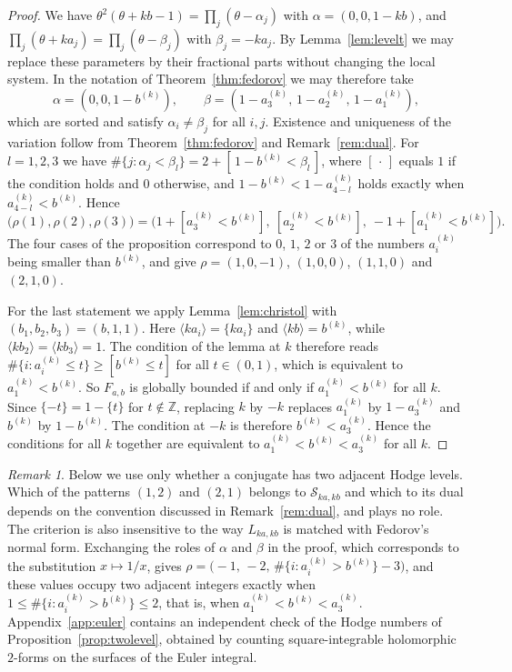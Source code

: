 \documentclass[11pt]{amsart}
\theoremstyle{definition}
\theoremstyle{remark}
\newtheorem{remark}[theorem]{Remark}
\numberwithin{equation}{section}
\newcommand{\Z}{\mathbb{Z}}
\newcommand{\cS}{\mathcal{S}}
\newcommand{\ak}[1]{a^{(k)}_{#1}}
\newcommand{\bk}{b^{(k)}}
\newcommand{\Fab}{F_{a,b}}
\begin{document}
\begin{proof}
We have $\theta^2(\theta+kb-1)=\prod_j(\theta-\alpha_j)$ with $\alpha=(0,0,1-kb)$, and $\prod_j(\theta+ka_j)=\prod_j(\theta-\beta_j)$ with $\beta_j=-ka_j$. By Lemma~\ref{lem:levelt} we may replace these parameters by their fractional parts without changing the local system. In the notation of Theorem~\ref{thm:fedorov} we may therefore take
\[
\alpha=(0,0,1-\bk),\qquad\beta=(1-\ak3,\,1-\ak2,\,1-\ak1),
\]
which are sorted and satisfy $\alpha_i\ne\beta_j$ for all $i,j$. Existence and uniqueness of the variation follow from Theorem~\ref{thm:fedorov} and Remark~\ref{rem:dual}. For $l=1,2,3$ we have $\#\{j:\alpha_j<\beta_l\}=2+[\,1-\bk<\beta_l\,]$, where $[\,\cdot\,]$ equals $1$ if the condition holds and $0$ otherwise, and $1-\bk<1-\ak{4-l}$ holds exactly when $\ak{4-l}<\bk$. Hence
\[
\big(\rho(1),\rho(2),\rho(3)\big)=\big(1+[\ak3<\bk],\ [\ak2<\bk],\ -1+[\ak1<\bk]\big).
\]
The four cases of the proposition correspond to $0$, $1$, $2$ or $3$ of the numbers $\ak i$ being smaller than $\bk$, and give $\rho=(1,0,-1)$, $(1,0,0)$, $(1,1,0)$ and $(2,1,0)$.

For the last statement we apply Lemma~\ref{lem:christol} with $(b_1,b_2,b_3)=(b,1,1)$. Here $\langle ka_i\rangle=\{ka_i\}$ and $\langle kb\rangle=\bk$, while $\langle kb_2\rangle=\langle kb_3\rangle=1$. The condition of the lemma at $k$ therefore reads $\#\{i:\ak i\le t\}\ge[\bk\le t]$ for all $t\in(0,1)$, which is equivalent to $\ak1<\bk$. So $\Fab$ is globally bounded if and only if $\ak1<\bk$ for all $k$. Since $\{-t\}=1-\{t\}$ for $t\notin\Z$, replacing $k$ by $-k$ replaces $\ak1$ by $1-\ak3$ and $\bk$ by $1-\bk$. The condition at $-k$ is therefore $\bk<\ak3$. Hence the conditions for all $k$ together are equivalent to $\ak1<\bk<\ak3$ for all $k$.
\end{proof}

\begin{remark}
Below we use only whether a conjugate has two adjacent Hodge levels. Which of the patterns $(1,2)$ and $(2,1)$ belongs to $\cS_{ka,kb}$ and which to its dual depends on the convention discussed in Remark~\ref{rem:dual}, and plays no role. The criterion is also insensitive to the way $L_{ka,kb}$ is matched with Fedorov's normal form. Exchanging the roles of $\alpha$ and $\beta$ in the proof, which corresponds to the substitution $x\mapsto1/x$, gives $\rho=\big(-1,\,-2,\,\#\{i:\ak i>\bk\}-3\big)$, and these values occupy two adjacent integers exactly when $1\le\#\{i:\ak i>\bk\}\le2$, that is, when $\ak1<\bk<\ak3$. Appendix~\ref{app:euler} contains an independent check of the Hodge numbers of Proposition~\ref{prop:twolevel}, obtained by counting square-integrable holomorphic $2$-forms on the surfaces of the Euler integral.
\end{remark}
\end{document}
